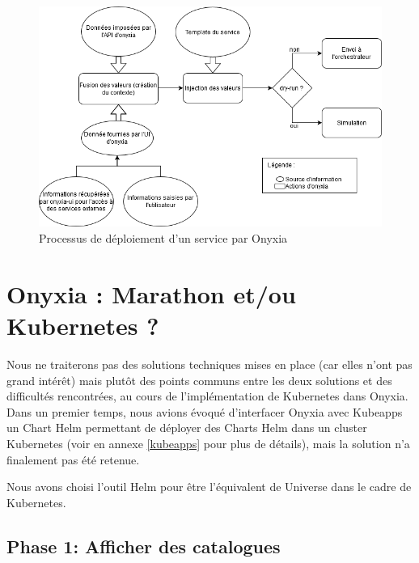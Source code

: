 \documentclass[11pt,fleqn]{book} %
\begin{document}
\begin{figure}[H]
\renewcommand{\figurename}{Diagramme}
\hspace{-1cm}
\includegraphics[scale=0.7]{Pictures/onyxia/onyxia-simplifie.png}
\captionsetup{margin=1.5cm,format=hang,justification=justified}
\caption[]{Processus de déploiement d'un service par Onyxia \newline}
\end{figure}



\section{Onyxia : Marathon et/ou Kubernetes ?}
Nous ne traiterons pas des solutions techniques mises en place (car elles n'ont pas grand intérêt) mais plutôt des points communs entre les deux solutions et des difficultés rencontrées, au cours de l'implémentation de Kubernetes dans Onyxia. Dans un premier temps, nous avions évoqué d'interfacer Onyxia avec Kubeapps un Chart Helm permettant de déployer des Charts Helm dans un cluster Kubernetes (voir en annexe \ref{kubeapps} pour plus de détails), mais la solution n'a finalement pas été retenue.\newline

Nous avons choisi l'outil Helm pour être l'équivalent de Universe dans le cadre de Kubernetes.
\subsection{Phase 1: Afficher des catalogues}
\end{document}
